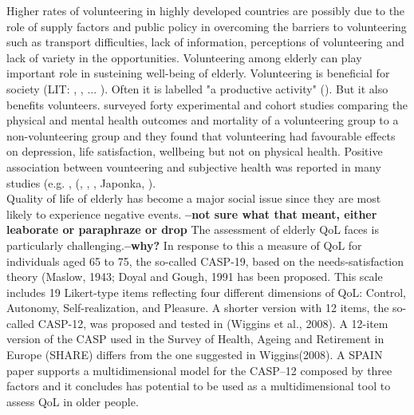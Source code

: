\documentclass[10pt, letterpaper]{article}
\begin{document}
\begin{spacing}{1.4}
Higher rates of volunteering in  highly developed countries are possibly due to the role of supply factors and public policy in overcoming the barriers to volunteering such as transport difficulties, lack of information, perceptions of volunteering and lack of variety in the opportunities. Volunteering among elderly can play important role in susteining well-being of elderly. Volunteering is beneficial for society (LIT: \citet{Oecd15}, \cite{prouteau06}, ... ). Often it is labelled "a productive activity" (\citet{hank09}). But it also benefits volunteers. \citet{jenkinson2013volunteering} surveyed forty experimental and cohort studies comparing the physical and mental health outcomes and mortality of a volunteering group to a non-volunteering group and they found that volunteering had favourable effects on depression, life satisfaction, wellbeing but not on physical health. Positive association between vounteering and subjective health was reported in many studies (e.g. \citet{borgonovi08}, (\cite{anderson14}, \cite{li06}, \cite{VanWilligen00}, Japonka,  \citet{detollenaere17}). \\

Quality of life  of elderly has become a major social issue since they are most
likely to experience negative events. \textbf{--not sure what that meant, either
leaborate or paraphraze or drop}
The assessment of elderly QoL faces is particularly challenging.\textbf{--why?} In response to this a measure of QoL for individuals aged 65 to 75, the so-called CASP-19, based on the needs-satisfaction theory (Maslow, 1943; Doyal and Gough, 1991 has been proposed. This scale includes 19 Likert-type items reflecting four different dimensions of QoL: Control, Autonomy, Self-realization, and Pleasure. A shorter version with 12 items, the so-called CASP-12, was proposed and tested in (Wiggins et al., 2008). A 12-item version of the CASP used in the Survey of Health, Ageing and Retirement in Europe (SHARE) differs from the one suggested in Wiggins(2008). A SPAIN paper supports a multidimensional model for the CASP–12 composed by three factors and it concludes has potential to be used as a multidimensional tool to assess QoL in older people. \\


\end{spacing}
\end{document}
